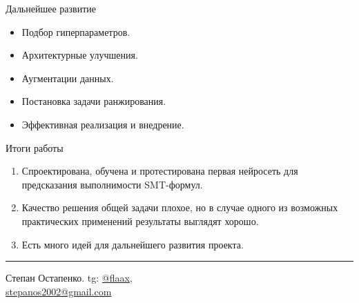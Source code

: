 \documentclass[14pt,aspectratio=169,hyperref={pdftex,unicode},xcolor=dvipsnames]{beamer}
\begin{document}
\begin{frame}{Дальнейшее развитие}

\begin{itemize}
  \item Подбор гиперпараметров.
  \item Архитектурные улучшения.
  \item Аугментации данных.
  \item Постановка задачи ранжирования.
  \item Эффективная реализация и внедрение.
\end{itemize}

\end{frame}



\begin{frame}{Итоги работы}

\begin{enumerate}
  \item Спроектирована, обучена и протестирована первая нейросеть для предсказания выполнимости SMT-формул.
  \item Качество решения общей задачи плохое, но в случае одного из возможных практических применений результаты выглядят хорошо.
  \item Есть много идей для дальнейшего развития проекта.
\end{enumerate}

\vspace{2mm}\hrule

\begin{minipage}{0.5\textwidth}
\begin{center}

Степан Остапенко. tg: \href{https://t.me/flaax}{@flaax}, \\ \href{mailto:stepanos2002@gmail.com}{stepanos2002@gmail.com}

\end{center}
\end{minipage}%
\begin{minipage}{0.5\textwidth}
\begin{center}


\end{center}
\end{minipage}
\end{frame}
\end{document}
